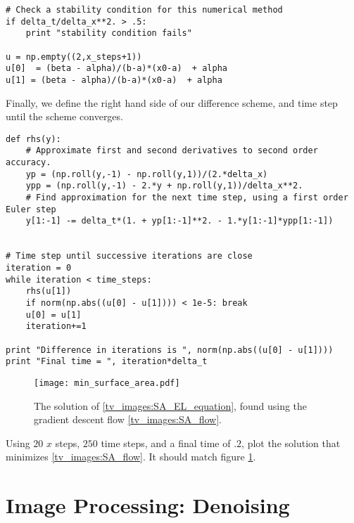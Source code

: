 \begin{lstlisting}
# Check a stability condition for this numerical method
if delta_t/delta_x**2. > .5:
    print "stability condition fails"

u = np.empty((2,x_steps+1))
u[0]  = (beta - alpha)/(b-a)*(x0-a)  + alpha
u[1] = (beta - alpha)/(b-a)*(x0-a)  + alpha
\end{lstlisting}

Finally, we define the right hand side of our difference scheme, and time step until the scheme converges.
\begin{lstlisting}
def rhs(y):
    # Approximate first and second derivatives to second order accuracy.
    yp = (np.roll(y,-1) - np.roll(y,1))/(2.*delta_x)
    ypp = (np.roll(y,-1) - 2.*y + np.roll(y,1))/delta_x**2.
    # Find approximation for the next time step, using a first order Euler step
    y[1:-1] -= delta_t*(1. + yp[1:-1]**2. - 1.*y[1:-1]*ypp[1:-1])


# Time step until successive iterations are close
iteration = 0
while iteration < time_steps:
    rhs(u[1])
    if norm(np.abs((u[0] - u[1]))) < 1e-5: break
    u[0] = u[1]
    iteration+=1

print "Difference in iterations is ", norm(np.abs((u[0] - u[1])))
print "Final time = ", iteration*delta_t
\end{lstlisting}

\begin{figure}
\centering
\texttt{[image: min\_surface\_area.pdf]}
\caption{The solution of \eqref{tv_images:SA_EL_equation}, found using the gradient descent flow \eqref{tv_images:SA_flow}.}
\label{fig:tv_images:SA_image}
\end{figure}

\begin{problem}
Using $20$ $x$ steps, $250$ time steps, and a final time of $.2$, plot the solution that minimizes \eqref{tv_images:SA_flow}.
It should match figure \ref{fig:tv_images:SA_image}.

\end{problem}

\section*{Image Processing: Denoising}

